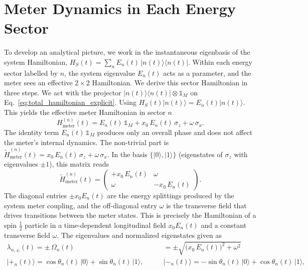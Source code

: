 \section{Meter Dynamics in Each Energy Sector}\label{sec:meter_dynamics}

\qquad To develop an analytical picture, we work in the instantaneous eigenbasis of the system Hamiltonian, $H_S(t) = \sum_n E_n(t)\,|n(t)\rangle\langle n(t)|$. Within each energy sector labelled by $n$, the system eigenvalue $E_n(t)$ acts as a parameter, and the meter sees an effective $2 \times 2$ Hamiltonian. We derive this sector Hamiltonian in three steps. We act with the projector $|n(t)\rangle\langle n(t)| \otimes \mathds{1}_M$ on Eq.~\eqref{eq:total_hamiltonian_explicit}. Using $H_S(t)|n(t)\rangle = E_n(t)|n(t)\rangle$. This yields the effective meter Hamiltonian in sector $n$
\begin{equation}\label{eq:meter_hamiltonian_sector}
    H_{\text{meter}}^{(n)}(t) = E_n(t)\,\mathds{1}_M + x_0\,E_n(t)\,\sigma_z + \omega\,\sigma_x.
\end{equation}
\qquad The identity term $E_n(t)\,\mathds{1}_M$ produces only an overall phase and does not affect the meter's internal dynamics. The non-trivial part is $\tilde{H}_{\text{meter}}^{(n)}(t) = x_0\,E_n(t)\,\sigma_z + \omega\,\sigma_x$. In the basis $\{|0\rangle, |1\rangle\}$ (eigenstates of $\sigma_z$ with eigenvalues $\pm 1$), this matrix reads
\begin{equation}\label{eq:meter_matrix}
    \tilde{H}_{\text{meter}}^{(n)}(t) = \begin{pmatrix} +x_0\,E_n(t) & \omega \\ \omega & -x_0\,E_n(t) \end{pmatrix}.
\end{equation}
\qquad The diagonal entries $\pm x_0 E_n(t)$ are the energy splittings produced by the system meter coupling, and the off-diagonal entry $\omega$ is the transverse field that drives transitions between the meter states. This is precisely the Hamiltonian of a spin $\tfrac{1}{2}$ particle in a time-dependent longitudinal field $x_0 E_n(t)$ and a constant transverse field $\omega$. The eigenvalues and normalized eigenstates given as
\begin{align}\label{eq:meter_eigenvalues}
    \lambda_{n,\pm}(t) = \pm\,\Omega_n(t) &= \pm \sqrt{\big(x_0\,E_n(t)\big)^2 + \omega^2} \nonumber \\
    |+_n(t)\rangle = \cos\theta_n(t)\,|0\rangle + \sin\theta_n(t)\,|1\rangle, \qquad
    &|-_n(t)\rangle = -\sin\theta_n(t)\,|0\rangle + \cos\theta_n(t)\,|1\rangle,
\end{align}
